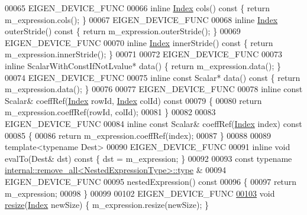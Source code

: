 \begin{DoxyCode}
00065     EIGEN\_DEVICE\_FUNC
00066     \textcolor{keyword}{inline} \hyperlink{namespace_eigen_a62e77e0933482dafde8fe197d9a2cfde}{Index} cols()\textcolor{keyword}{ const }\{ \textcolor{keywordflow}{return} m\_expression.cols(); \}
00067     EIGEN\_DEVICE\_FUNC
00068     \textcolor{keyword}{inline} \hyperlink{namespace_eigen_a62e77e0933482dafde8fe197d9a2cfde}{Index} outerStride()\textcolor{keyword}{ const }\{ \textcolor{keywordflow}{return} m\_expression.outerStride(); \}
00069     EIGEN\_DEVICE\_FUNC
00070     \textcolor{keyword}{inline} \hyperlink{namespace_eigen_a62e77e0933482dafde8fe197d9a2cfde}{Index} innerStride()\textcolor{keyword}{ const }\{ \textcolor{keywordflow}{return} m\_expression.innerStride(); \}
00071 
00072     EIGEN\_DEVICE\_FUNC
00073     \textcolor{keyword}{inline} ScalarWithConstIfNotLvalue* data() \{ \textcolor{keywordflow}{return} m\_expression.data(); \}
00074     EIGEN\_DEVICE\_FUNC
00075     \textcolor{keyword}{inline} \textcolor{keyword}{const} Scalar* data()\textcolor{keyword}{ const }\{ \textcolor{keywordflow}{return} m\_expression.data(); \}
00076 
00077     EIGEN\_DEVICE\_FUNC
00078     \textcolor{keyword}{inline} \textcolor{keyword}{const} Scalar& coeffRef(\hyperlink{namespace_eigen_a62e77e0933482dafde8fe197d9a2cfde}{Index} rowId, \hyperlink{namespace_eigen_a62e77e0933482dafde8fe197d9a2cfde}{Index} colId)\textcolor{keyword}{ const}
00079 \textcolor{keyword}{    }\{
00080       \textcolor{keywordflow}{return} m\_expression.coeffRef(rowId, colId);
00081     \}
00082 
00083     EIGEN\_DEVICE\_FUNC
00084     \textcolor{keyword}{inline} \textcolor{keyword}{const} Scalar& coeffRef(\hyperlink{namespace_eigen_a62e77e0933482dafde8fe197d9a2cfde}{Index} index)\textcolor{keyword}{ const}
00085 \textcolor{keyword}{    }\{
00086       \textcolor{keywordflow}{return} m\_expression.coeffRef(index);
00087     \}
00088 
00089     \textcolor{keyword}{template}<\textcolor{keyword}{typename} Dest>
00090     EIGEN\_DEVICE\_FUNC
00091     \textcolor{keyword}{inline} \textcolor{keywordtype}{void} evalTo(Dest& dst)\textcolor{keyword}{ const }\{ dst = m\_expression; \}
00092 
00093     \textcolor{keyword}{const} \textcolor{keyword}{typename} \hyperlink{group___sparse_core___module}{internal::remove\_all<NestedExpressionType>::type}
      & 
00094     EIGEN\_DEVICE\_FUNC
00095     nestedExpression()\textcolor{keyword}{ const }
00096 \textcolor{keyword}{    }\{
00097       \textcolor{keywordflow}{return} m\_expression;
00098     \}
00099 
00102     EIGEN\_DEVICE\_FUNC
\hyperlink{group___core___module_a04bcb4140d2b2f9bf571efddac135a21}{00103}     \textcolor{keywordtype}{void} \hyperlink{group___core___module_a04bcb4140d2b2f9bf571efddac135a21}{resize}(\hyperlink{namespace_eigen_a62e77e0933482dafde8fe197d9a2cfde}{Index} newSize) \{ m\_expression.resize(newSize); \}

\end{DoxyCode}
